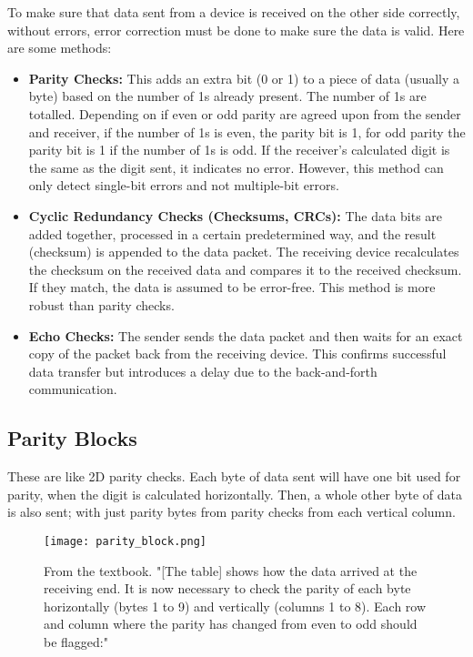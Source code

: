 \documentclass[../main.tex]{subfiles}
\begin{document}
To make sure that data sent from a device is received on the other side correctly, without errors, error correction must be done to make sure the data is valid. Here are some methods:

\begin{itemize}
    \item \textbf{Parity Checks:} This adds an extra bit (0 or 1) to a piece of data (usually a byte) based on the number of 1s already present. The number of 1s are totalled. Depending on if even or odd parity are agreed upon from the sender and receiver, if the number of 1s is even, the parity bit is 1, for odd parity the parity bit is 1 if the number of 1s is odd. If the receiver's calculated digit is the same as the digit sent, it indicates no error. However, this method can only detect single-bit errors and not multiple-bit errors.
    \item \textbf{Cyclic Redundancy Checks (Checksums, CRCs):} The data bits are added together, processed in a certain predetermined way, and the result (checksum) is appended to the data packet. The receiving device recalculates the checksum on the received data and compares it to the received checksum. If they match, the data is assumed to be error-free. This method is more robust than parity checks.
    \item \textbf{Echo Checks:} The sender sends the data packet and then waits for an exact copy of the packet back from the receiving device. This confirms successful data transfer but introduces a delay due to the back-and-forth communication.
\end{itemize}

\subsection{Parity Blocks}

These are like 2D parity checks. Each byte of data sent will have one bit used for parity, when the digit is calculated horizontally. Then, a whole other byte of data is also sent; with just parity bytes from parity checks from each vertical column.

\begin{figure}[h]
    \centering
    \texttt{[image: parity\_block.png]}
    \caption{From the textbook. "[The table] shows how the data arrived at the receiving end. It is now necessary to check the parity of each byte horizontally (bytes 1 to 9) and vertically (columns 1 to 8). Each row and column where the parity has changed from even to odd should be flagged:"}
    \label{fig:parity_block}
\end{figure}
\end{document}
